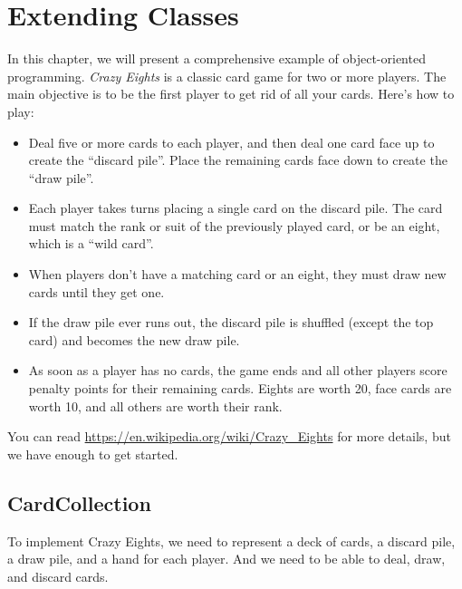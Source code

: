 \chapter{Extending Classes}
\label{eights}


In this chapter, we will present a comprehensive example of object-oriented programming.
{\it Crazy Eights} is a classic card game for two or more players.
The main objective is to be the first player to get rid of all your cards.
Here's how to play:

\begin{itemize}

\item Deal five or more cards to each player, and then deal one card face up to create the ``discard pile''.
Place the remaining cards face down to create the ``draw pile''.

\item Each player takes turns placing a single card on the discard pile.
The card must match the rank or suit of the previously played card, or be an eight, which is a ``wild card''.

\item When players don't have a matching card or an eight, they must draw new cards until they get one.

\item If the draw pile ever runs out, the discard pile is shuffled (except the top card) and becomes the new draw pile.

\item As soon as a player has no cards, the game ends and all other players score penalty points for their remaining cards.
Eights are worth 20, face cards are worth 10, and all others are worth their rank.

\end{itemize}

You can read \url{https://en.wikipedia.org/wiki/Crazy_Eights} for more details, but we have enough to get started.



\section{CardCollection}

To implement Crazy Eights, we need to represent a deck of cards, a discard pile, a draw pile, and a hand for each player.
And we need to be able to deal, draw, and discard cards.

